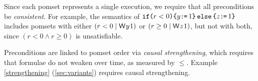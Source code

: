 Since each pomset represents a single execution, we require that all
preconditions be \emph{consistent}.  For example, the semantics of
$\texttt{if}\allowbreak\texttt{(}r<0\texttt{)}\allowbreak\texttt{\{} y\texttt{:}\mkern-1mu\texttt{=}\,1 \texttt{\}}\,\allowbreak\texttt{else}\allowbreak\,\texttt{\{} z\texttt{:}\mkern-1mu\texttt{=}\,1\texttt{\}}$ includes pomsets with either
$(r<0\mid\DW{y}{1})$ or $(r\geq0\mid\DW{z}{1})$, but not with both, since
$(r<0\land r\geq0)$ is unsatisfiable.

Preconditions are linked to pomset order via \emph{causal strengthening},
which requires that formulae do not weaken over time, as measured by $\le$.
Example \ref{strengthening} (\textsection\ref{sec:variants}) requires causal
strengthening. %

